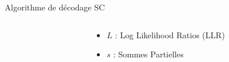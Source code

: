 \begin{frame}[c]{Algorithme de décodage SC}
	\begin{columns}[T] %
		\begin{column}{.55\textwidth}
		\end{column}
		\begin{column}{.45\textwidth}
		\begin{itemize}
			\item<1-> $L$ : Log Likelihood Ratios (LLR)
			\item<3-> $s$ : Sommes Partielles
		\end{itemize}
		\vspace{1cm}
		\end{column}
	\end{columns}

\end{frame}







